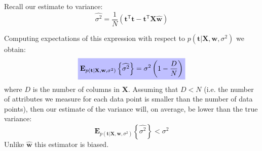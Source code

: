 \documentclass[a4paper,11pt]{article} %
\newcommand{\highlighteq}[1]{\colorbox{blue!25}{$\displaystyle#1$}}
\begin{document}
Recall our estimate to variance:
\begin{equation}
\widehat{\sigma^2} = \frac{1}{N}
\left( \mathbf{t}^{\mathsf{T}}\mathbf{t} - 
\mathbf{t}^{\mathsf{T}}\mathbf{X}\widehat{\mathbf{w}}
\right)
\end{equation}

Computing expectations of this expression with respect to $p(\mathbf{t}|\mathbf{X},\mathbf{w},\sigma^2)$
we obtain:
\begin{equation}
\highlighteq{
\mathbf{E}_{p(\mathbf{t}|\mathbf{X},\mathbf{w},\sigma^2)}
\left\{\widehat{\sigma^2}\right\} =
\sigma^2 \left( 1 - \frac{D}{N} \right)
}
\end{equation}
where $D$ is the number of columns in $\mathbf{X}$. Assuming that $D < N$
(i.e. the number of attributes we measure for each data
point is smaller than the number of data points), then our estimate of the variance
will, on average, be lower than the true variance:
\begin{equation}
\mathbf{E}_{p(\mathbf{t}|\mathbf{X},\mathbf{w},\sigma^2)}
\left\{\widehat{\sigma^2}\right\} < \sigma^2
\end{equation}
Unlike $\widehat{\mathbf{w}}$ this estimator is biased.



\end{document}
